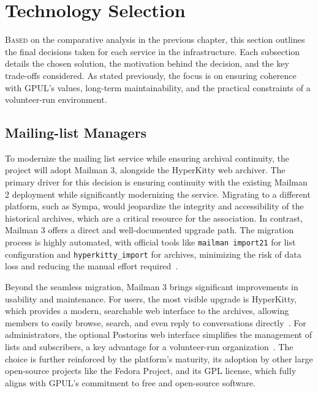%

\chapter{Technology Selection}
\label{chap:technology-selection}

\lettrine{B}{ased} on the comparative analysis in the previous chapter, this section outlines the final decisions taken for each service in the infrastructure.  
Each subsection details the chosen solution, the motivation behind the decision, and the key trade-offs considered.  
As stated previously, the focus is on ensuring coherence with GPUL's values, long-term maintainability, and the practical constraints of a volunteer-run environment.

\section{Mailing-list Managers}

To modernize the mailing list service while ensuring archival continuity, the project will adopt Mailman 3, alongside the HyperKitty web archiver. The primary driver for this decision is ensuring continuity with the existing Mailman 2 deployment while significantly modernizing the service. Migrating to a different platform, such as Sympa, would jeopardize the integrity and accessibility of the historical archives, which are a critical resource for the association. In contrast, Mailman 3 offers a direct and well-documented upgrade path. The migration process is highly automated, with official tools like \texttt{mailman import21} for list configuration and \texttt{hyperkitty\_import} for archives, minimizing the risk of data loss and reducing the manual effort required~\cite{mailman3-migration}.

Beyond the seamless migration, Mailman 3 brings significant improvements in usability and maintenance. For users, the most visible upgrade is HyperKitty, which provides a modern, searchable web interface to the archives, allowing members to easily browse, search, and even reply to conversations directly~\cite{hyperkitty-docs}. For administrators, the optional Postorius web interface simplifies the management of lists and subscribers, a key advantage for a volunteer-run organization~\cite{postorius-docs}. The choice is further reinforced by the platform's maturity, its adoption by other large open-source projects like the Fedora Project, and its GPL license, which fully aligns with GPUL's commitment to free and open-source software.

